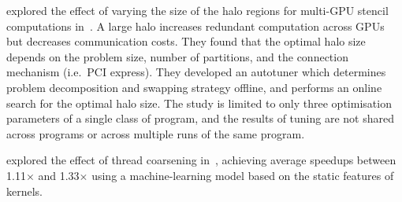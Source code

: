 
\citeauthor{Lutz2013} explored the effect of varying the size of the
halo regions for multi-GPU stencil computations in~\cite{Lutz2013}. A
large halo increases redundant computation across GPUs but decreases
communication costs. They found that the optimal halo size depends on
the problem size, number of partitions, and the connection mechanism
(i.e.\ PCI express). They developed an autotuner which determines
problem decomposition and swapping strategy offline, and performs an
online search for the optimal halo size. The study is limited to only
three optimisation parameters of a single class of program, and the
results of tuning are not shared across programs or across multiple
runs of the same program.



\citeauthor{Magni2014} explored the effect of thread coarsening
in~\cite{Magni2014}, achieving average speedups between 1.11$\times$
and 1.33$\times$ using a machine-learning model based on the static
features of kernels.






